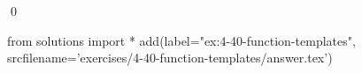 
\begin{ex}
  \label{ex:4-40-function-templates}
  
  \qed
\end{ex}
\begin{python0}
from solutions import *
add(label="ex:4-40-function-templates",
    srcfilename='exercises/4-40-function-templates/answer.tex')
\end{python0}
